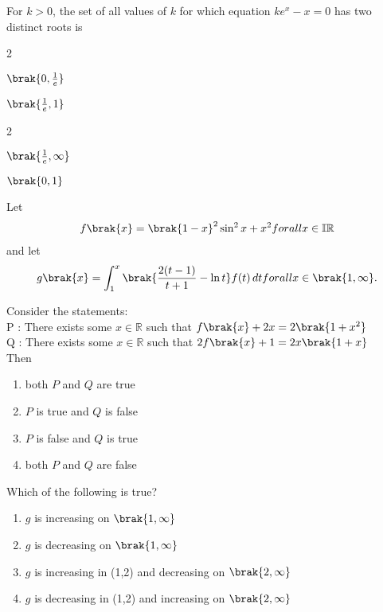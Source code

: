 {	\item For $k>0$, the set of all values of $k$ for which equation $ke^x-x=0$ has two distinct roots is 
		\hfill {}\\
			\begin{enumerate}
		\end{enumerate} 
}

\item 
{
	Let \begin{align}f\brak{x}=\brak{1-x}^2 \sin^2 x + x^2 for all x \in \mathbb{IR} \end{align} and let \begin{align}g\brak{x}=
	\int_{1}^{x} \brak{\frac{2(t-1)}{t+1} - \ln t}  f(t) \, dt for all x \in \brak{1 ,\infty}.\end{align}
	\item Consider the statements:\\
	P : There exists some $x \in \mathbb{R}$ such that $f\brak{x} + 2x = 2\brak{1+x^2}$\\
	Q : There exists some $x \in\mathbb{R}$ such that $2f\brak{x} + 1 = 2x\brak{1+x}$\\
	    Then
	    \hfill{\brak{2012}}
	\begin{enumerate}
		\item both $P$ and $Q$ are true
		\item $P$ is true and $Q$ is false
		\item $P$ is false and $Q$ is true
		\item both $P$ and $Q$ are false
	\end{enumerate}



	\item Which of the following is true?
		\hfill{}
\begin{enumerate}

		\item $g$ is increasing on $\brak{1,\infty}$
		\item $g$ is decreasing on $\brak{1,\infty}$
		\item $g$ is increasing in (1,2) and decreasing on $\brak{2,\infty}$
		\item $g$ is decreasing in (1,2) and increasing on $\brak{2,\infty}$

\end{enumerate} 
}



